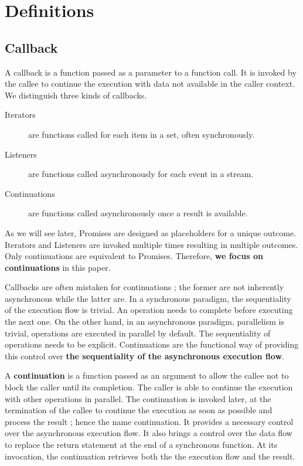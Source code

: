 \section{Definitions} \label{section:definitions}

\subsection{Callback} \label{section:definitions:continuation}

A callback is a function passed as a parameter to a function call.
It is invoked by the callee to continue the execution with data not available in the caller context.
We distinguish three kinds of callbacks.

\begin{description}
  \item[Iterators] are functions called for each item in a set, often synchronously.
  \item[Listeners] are functions called asynchronously for each event in a stream.
  \item[Continuations] are functions called asynchronously once a result is available.
\end{description}

As we will see later, Promises are designed as placeholders for a unique outcome.
Iterators and Listeners are invoked multiple times resulting in multiple outcomes.
Only continuations are equivalent to Promises.
Therefore, \textbf{we focus on continuations} in this paper.

Callbacks are often mistaken for continuations ; the former are not inherently asynchronous while the latter are.
In a synchronous paradigm, the sequentiality of the execution flow is trivial.
An operation needs to complete before executing the next one.
On the other hand, in an asynchronous paradigm, parallelism is trivial, operations are executed in parallel by default.
The sequentiality of operations needs to be explicit.
Continuations are the functional way of providing this control over \textbf{the sequentiality of the asynchronous execution flow}.

A \textbf{continuation} is a function passed as an argument to allow the callee not to block the caller until its completion.
The caller is able to continue the execution with other operations in parallel.
The continuation is invoked later, at the termination of the callee to continue the execution as soon as possible and process the result ; hence the name continuation.
It provides a necessary control over the asynchronous execution flow.
It also brings a control over the data flow to replace the return statement at the end of a synchronous function.
At its invocation, the continuation retrieves both the the execution flow and the result.

